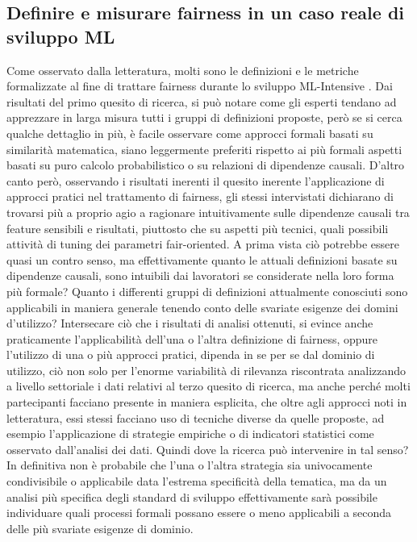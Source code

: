     \subsection{Definire e misurare fairness in un caso reale di sviluppo ML}
    Come osservato dalla letteratura, molti sono le definizioni e le metriche formalizzate al fine di trattare fairness durante lo sviluppo ML-Intensive \cite{FairnessDefinitionExplained}. Dai risultati del primo quesito di ricerca, si può notare come gli esperti tendano ad apprezzare in larga misura tutti i gruppi di definizioni proposte, però se si cerca qualche dettaglio in più, è facile osservare come approcci formali basati su similarità matematica, siano leggermente preferiti rispetto ai più formali aspetti basati su puro calcolo probabilistico o su relazioni di dipendenze causali. D'altro canto però, osservando i risultati inerenti il quesito inerente l'applicazione di approcci pratici nel trattamento di fairness, gli stessi intervistati dichiarano di trovarsi più a proprio agio a ragionare intuitivamente sulle dipendenze causali tra feature sensibili e risultati, piuttosto che su aspetti più tecnici, quali possibili attività di tuning dei parametri fair-oriented. A prima vista ciò potrebbe essere quasi un contro senso, ma effettivamente quanto le attuali definizioni basate su dipendenze causali, sono intuibili dai lavoratori se considerate nella loro forma più formale? Quanto i differenti gruppi di definizioni attualmente conosciuti sono applicabili in maniera generale tenendo conto delle svariate esigenze dei domini d'utilizzo? Intersecare ciò che i risultati di analisi ottenuti, si evince anche praticamente l'applicabilità dell'una o l'altra definizione di fairness, oppure l'utilizzo di una o più approcci pratici, dipenda in se per se dal dominio di utilizzo, ciò non solo per l'enorme variabilità di rilevanza riscontrata analizzando a livello settoriale i dati relativi al terzo quesito di ricerca, ma anche perché molti partecipanti facciano presente in maniera esplicita, che oltre agli approcci noti in letteratura, essi stessi facciano uso di tecniche diverse da quelle proposte, ad esempio l'applicazione di strategie empiriche o di indicatori statistici come osservato dall'analisi dei dati. Quindi dove la ricerca può intervenire in tal senso? In definitiva non è probabile che l'una o l'altra strategia sia univocamente condivisibile o applicabile data l'estrema specificità della tematica, ma da un analisi più specifica degli standard di sviluppo effettivamente sarà possibile individuare quali processi formali possano essere o meno applicabili a seconda delle più svariate esigenze di dominio.
    
